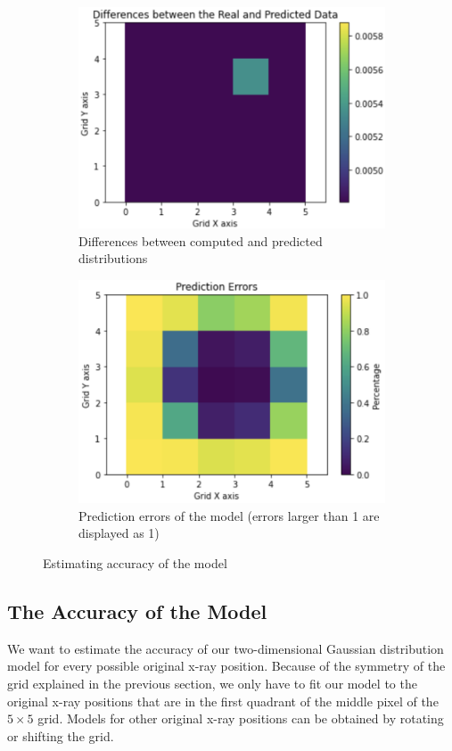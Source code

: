 \documentclass{article}
\begin{document}
\begin{figure}[H]
\begin{subfigure}{.5\textwidth}
  \centering
  \includegraphics[width=0.9\linewidth]{images/differences.png}
  \caption{Differences between computed and predicted\\ distributions}
  \label{fig:sub1}
\end{subfigure}%
\begin{subfigure}{.5\textwidth}
  \centering
  \includegraphics[width=0.9\linewidth]{images/errors.png}
  \caption{Prediction errors of the model (errors larger than 1 are displayed as 1)}
  \label{fig:sub2}
\end{subfigure}
\caption{Estimating accuracy of the model}
\label{fig:accuracy}
\end{figure}

\subsection{The Accuracy of the Model}
We want to estimate the accuracy of our two-dimensional Gaussian distribution model for every possible original x-ray position. Because of the symmetry of the grid explained in the previous section, we only have to fit our model to the original x-ray positions that are in the first quadrant of the middle pixel of the $5\times 5$ grid. Models for other original x-ray positions can be obtained by rotating or shifting the grid.
\end{document}
